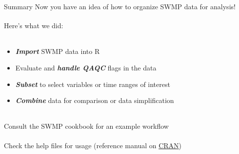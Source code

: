 \documentclass[xcolor=dvipsnames,serif]{beamer}\usepackage[]{graphicx}\usepackage[]{color}
\newcommand{\Bigtxt}[1]{\textbf{\textit{#1}}}
\begin{document}
\begin{frame}[fragile]{Summary}
Now you have an idea of how to organize SWMP data for analysis!\\~\\
Here's what we did: \\~\\
\begin{itemize}
\item \Bigtxt{Import} SWMP data into R
\item Evaluate and \Bigtxt{handle QAQC} flags in the data 
\item \Bigtxt{Subset} to select variables or time ranges of interest 
\item \Bigtxt{Combine} data for comparison or data simplification \\~\\
\end{itemize}
Consult the SWMP cookbook for an example workflow\\~\\
Check the help files for usage (reference manual on \href{https://cran.r-project.org/web/packages/SWMPr/index.html}{CRAN})
\end{frame}
\end{document}
